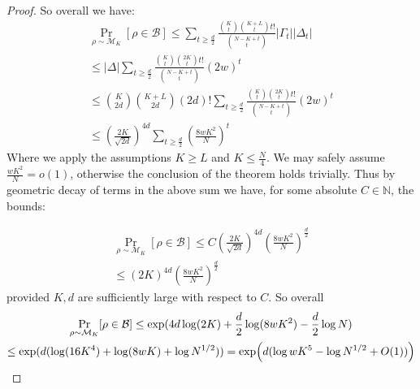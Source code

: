 \documentclass[11pt]{article}
\newtheorem{conjecture}{Conjecture}
\newcommand{\todo}[1]{\textcolor{red}{TODO: #1}}
\begin{document}
\begin{proof}
So overall we have:
\begin{gather*}
\Pr_{\rho \sim \mathcal{M}_{K}}[\rho \in \mathcal{B}] \leq \sum\limits_{t \geq \frac{d}{2}}
\frac{\binom{K}{t}\binom{K+L}{t}t!}{\binom{N-K+t}{t}} |\Gamma_t| |\Delta_t|\\
\leq |\Delta|\sum\limits_{t \geq \frac{d}{2}}
\frac{\binom{K}{t}\binom{2K}{t}t!}{\binom{N-K+t}{t}} (2w)^t \\
\leq 
\binom{K}{2d}\binom{K+L}{2d}(2d)!\sum\limits_{t \geq \frac{d}{2}}
\frac{\binom{K}{t}\binom{2K}{t}t!}{\binom{N-K+t}{t}} (2w)^t \\
\leq (\frac{2K}{\sqrt{2d}})^{4d}\sum\limits_{t \geq \frac{d}{2}} \left(\frac{8wK^2}{N}\right)^t
\end{gather*}
Where we apply the assumptions $K \geq L$ and $K\leq \frac{N}{4}$. We may safely assume $\frac{wK^2}{N} = o(1)$, otherwise the conclusion of the theorem holds trivially. Thus by geometric decay of terms in the above sum we have, for some absolute $C \in \mathbb{N}$, the bounds:

\begin{gather*}
\Pr_{\rho \sim \mathcal{M}_{K}}[\rho \in \mathcal{B}] \leq C (\frac{2K}{\sqrt{2d}})^{4d}\left(\frac{8wK^2}{N}\right)^{\frac{d}{2}} \\
\leq (2K)^{4d} \left(\frac{8wK^2}{N}\right)^{\frac{d}{2}}
\end{gather*}
provided $K, d$ are sufficiently large with respect to $C$. So overall
\begin{gather*}
\Pr_{\rho \sim \mathcal{M}_{K}}[\rho \in \mathcal{B}] \leq \exp(4d \log(2K) + \frac{d}{2}\log(8wK^2) - \frac{d}{2} \log N) \\
\leq \exp(d(\log (16K^4) + \log (8wK) + \log N^{1/2}))
= \exp\Bigl(d (\log wK^5 -\log N^{1/2} + O(1))\Bigr)
\end{gather*}



\end{proof}

\end{document}
